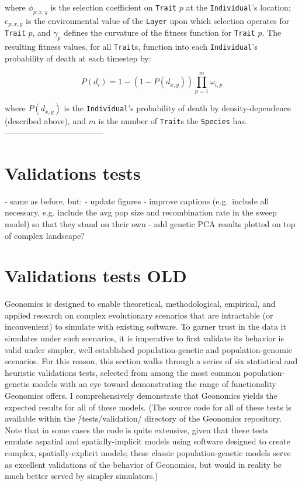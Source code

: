 ﻿\documentclass{article}
\begin{document}
where $\phi_{p;x,y}$ is the selection coefficient on \texttt{Trait} $p$ at the
\texttt{Individual}'s location; $e_{p;x,y}$ is the environmental value
of the \texttt{Layer} upon which selection operates for \texttt{Trait} $p$,
and $\gamma_{p}$ defines the curvature of the fitness function for \texttt{Trait} $p$.
The resulting fitness values, for all \texttt{Trait}s, function into each
\texttt{Individual}'s probability of death at each timestep by:

\begin{equation}
P(d_{i}) = 1 - (1 - P(d_{x,y})) \prod_{p = 1}^{m}\omega_{i,p}
\end{equation}

where $P(d_{x,y})$ is the \texttt{Individual}'s probability of death by
density-dependence (described above), and $m$ is the number of \texttt{Trait}s
the \texttt{Species} has.
------------------------------------


\section{Validations tests}
- same as before, but:
        - update figures
        - improve captions (e.g.\ include all necessary, e.g. include the avg pop size
        and recombination rate in the sweep model) so that they stand on their own
        - add genetic PCA results plotted on top of complex landscape?

\section{Validations tests OLD}
Geonomics is designed to enable theoretical, methodological, empirical, and applied
research on complex evolutionary scenarios that are intractable (or inconvenient)
to simulate with existing software.
To garner trust in the data it simulates under such scenarios, 
it is imperative to first validate its behavior is valid under simpler,
well established population-genetic and population-genomic scenarios.
For this reason, this section walks through a series of six statistical
and heuristic validations tests, selected from among the most
common population-genetic models with an eye toward demonstrating the range
of functionality Geonomics offers.
I comprehensively demonstrate that Geonomics yields the expected results
for all of these models.
(The source code for all of these tests is available within the
\./tests/validation/ directory of the Geonomics repository.
Note that in some cases the code is quite extensive, given that these tests
emulate aspatial and spatially-implicit models using software designed to
create complex, spatially-explicit models; these classic population-genetic models
serve as excellent validations of the behavior of Geonomics,
but would in reality be much better served by simpler simulators.)
\end{document}

